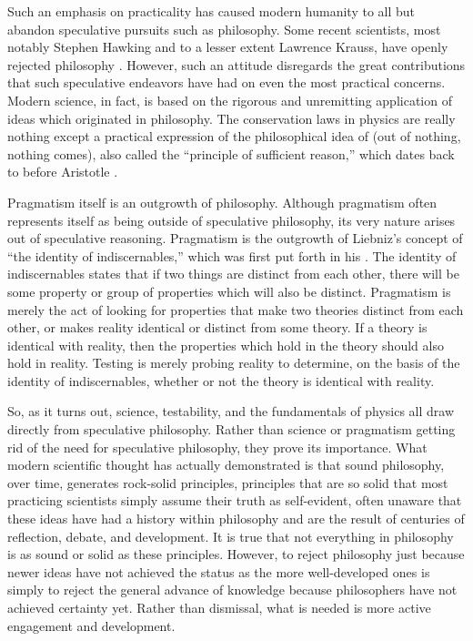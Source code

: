 Such an emphasis on practicality has caused modern humanity to all but abandon speculative pursuits such as philosophy.  
Some recent scientists, most notably Stephen Hawking and to a lesser extent Lawrence Krauss, have openly rejected philosophy \citep{warman2011, andersen2012}.
However, such an attitude disregards the great contributions that such speculative endeavors have had on even the most practical concerns.  Modern science, in fact, is based on the rigorous and unremitting application of ideas which originated in philosophy.  The conservation laws in physics are really nothing except a practical expression of the philosophical idea of  (out of nothing, nothing comes), also called the ``principle of sufficient reason,'' which dates back to before Aristotle \citep{psr2011}.

Pragmatism itself is an outgrowth of philosophy.  Although pragmatism often represents itself as being outside of speculative philosophy,  its very nature arises out of speculative reasoning.  Pragmatism is the outgrowth of Liebniz's concept of ``the identity of indiscernables,'' which was first put forth in his  \citep{ident2012}.  The identity of indiscernables states that if two things are distinct from each other, there will be some property or group of properties which will also be distinct.  Pragmatism is merely the act of looking for properties that make two theories distinct from each other, or makes reality identical or distinct from some theory.  If a theory is identical with reality, then the properties which hold in the theory should also hold in reality.  Testing is merely probing reality to determine, on the basis of the identity of indiscernables, whether or not the theory is identical with reality.

So, as it turns out, science, testability, and the fundamentals of physics all draw directly from speculative philosophy.  Rather than science or pragmatism getting rid of the need for speculative philosophy, they prove its importance.  What modern scientific thought has actually demonstrated is that sound philosophy, over time, generates rock-solid principles, principles that are so solid that most practicing scientists simply assume their truth as self-evident, often unaware that these ideas have had a history within philosophy and are the result of centuries of reflection, debate, and development.  It is true that not everything in philosophy is as sound or solid as these principles.  However, to reject philosophy just because newer ideas have not achieved the status as the more well-developed ones is simply to reject the general advance of knowledge because philosophers have not achieved certainty yet.  Rather than dismissal, what is needed is more active engagement and development.

